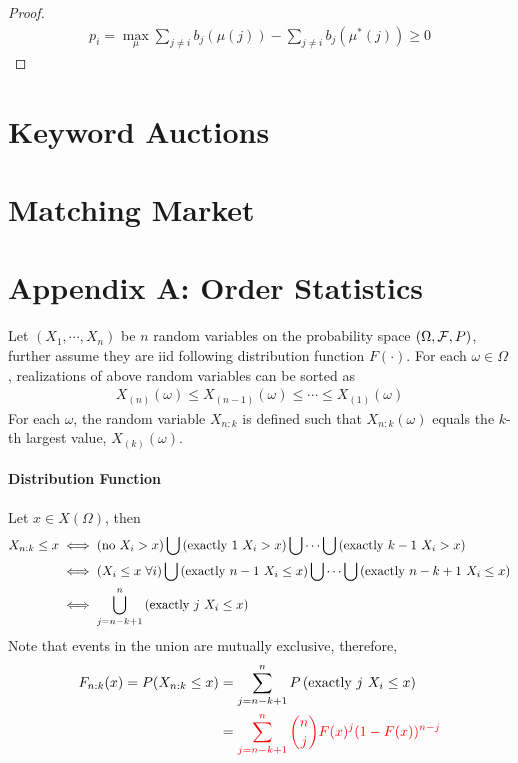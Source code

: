 \documentclass{article}
\begin{document}
	\begin{proof}
		\begin{align}
			p_i = \max_\mu \sum_{j \neq i} b_j(\mu(j)) - \sum_{j \neq i}b_j(\mu^*(j)) \geq 0
		\end{align}
	\end{proof}
	
	\section{Keyword Auctions}
	
	\section{Matching Market}

	\section{Appendix A: Order Statistics}
	\begin{definition}
		Let $(X_1, \cdots, X_n)$ be $n$ random variables on the probability space $(\Omega, \mathcal{{F}}, P)$, further assume they are iid following distribution function $F(\cdot)$. For each $\omega \in \Omega$, realizations of above random variables can be sorted as
		\begin{align}
			X_{(n)}(\omega) \leq X_{(n-1)}(\omega) \leq \cdots \leq X_{(1)}(\omega)
		\end{align}
		For each $\omega$, the random variable $X_{n:k}$ is defined such that $X_{n:k}(\omega)$ equals the $k$-th largest value, $X_{(k)}(\omega)$.
	\end{definition}
	
	\paragraph{Distribution Function} Let $x \in X(\Omega)$, then 
	\begin{align}
		X_{n:k} \leq x
		&\iff (\text{{no $X_i > x$}}) \bigcup \left(\text{{exactly $1$ $X_i > x$}}\right) \bigcup  \cdots \bigcup \left(\text{{exactly $k-1$ $X_i > x$}}\right) \\
		&\iff (X_i \leq x\ \forall i) \bigcup \left(\text{{exactly $n-1$ $X_i \leq x$}}\right) \bigcup  \cdots \bigcup \left(\text{{exactly $n-k+1$ $X_i \leq x$}}\right) \\
		&\iff \bigcup_{j=n-k+1}^n \left(\text{{exactly $j$ $X_i \leq x$}}\right)
	\end{align}
	Note that events in the union are mutually exclusive, therefore,
	\begin{align}
		F_{n:k}(x) = P(X_{n:k} \leq x)
		&= \sum_{j=n-k+1}^n P\left(\text{{exactly $j$ $X_i \leq x$}}\right) \\
		&= \textcolor{red}{\sum_{j=n-k+1}^n \binom{n}{j} F(x)^j (1 - F(x))^{n-j}}
	\end{align}
\end{document}
